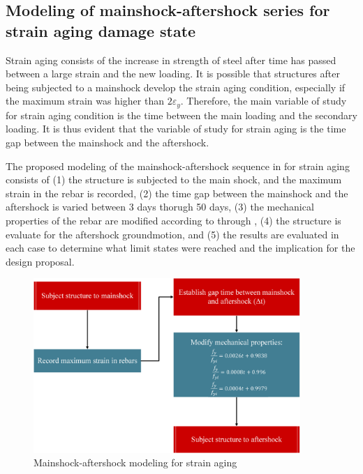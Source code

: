 \subsection{Modeling of mainshock-aftershock series for strain aging damage state}

Strain aging consists of the increase in strength of steel after time has passed between a large strain and the new loading. It is possible that structures after being subjected to a mainshock develop the strain aging condition, especially if the maximum strain was higher than $2\varepsilon_{y}$. Therefore, the main variable of study for strain aging condition is the time between the main loading and the secondary loading. It is thus evident that the variable of study for strain aging is the time gap between the mainshock and the aftershock. 

The proposed modeling of the mainshock-aftershock sequence in for strain aging consists of (1) the structure is subjected to the main shock, and the maximum strain in the rebar is recorded, (2) the time gap between the mainshock and the aftershock is varied between 3 days thorugh 50 days, (3) the mechanical properties of the rebar are modified according to  through , (4) the structure is evaluate for the aftershock groundmotion, and (5) the results are evaluated in each case to determine what limit states were reached and the implication for the design proposal.

\begin{figure}[htbp]
	\centering
	\includegraphics[width=0.9\textwidth]{Chapter-5/figs/StrainAgeing_Modeling}
	\caption{Mainshock-aftershock modeling for strain aging}
	\label{fig:AgingModel}
\end{figure}

\newpage
